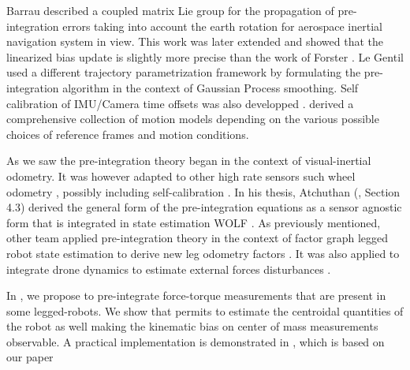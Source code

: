 Barrau \cite{barrau2020mathematical} described a coupled matrix Lie group for the propagation of pre-integration errors taking into account the earth rotation for aerospace
inertial navigation system in view. This work was later extended \cite{brossard2021associating} and showed that the linearized bias update is slightly more precise than 
the work of Forster \cite{forster2017-TRO}. Le Gentil \cite{le2020gaussian} used a different trajectory parametrization framework by formulating the pre-integration algorithm 
in the context of Gaussian Process smoothing. Self calibration of IMU/Camera time offsets was also developped \cite{yang2020analytic}. 
\cite{luo2021unified} derived a comprehensive collection of motion models depending on the various possible choices of reference frames and motion conditions. 

As we saw the pre-integration theory began in the context of visual-inertial odometry. It was however adapted to other high rate sensors such wheel odometry \cite{quan2019tightly}, 
possibly including self-calibration \cite{deray-19-selfcalib}. In his thesis, Atchuthan (\cite{atchuthan-18-thesis}, Section 4.3) derived the general form of the pre-integration 
equations as a sensor agnostic form that is integrated in state estimation WOLF \cite{sola2021wolf}. As previously mentioned, other team applied pre-integration theory in the 
context of factor graph legged robot state estimation to derive new leg odometry factors \cite{hartley2018legged, wisth2019robust, wisth2020pre-integrated}.
It was also applied to integrate drone dynamics to estimate external forces disturbances \cite{nisar2019vimo}.

In , we propose to pre-integrate force-torque measurements that are present in some legged-robots. We show that permits to estimate the centroidal quantities of the robot as well making the kinematic bias on center of mass measurements observable. A practical implementation is demonstrated in , which is based on our paper \cite{fourmy2021contact}

